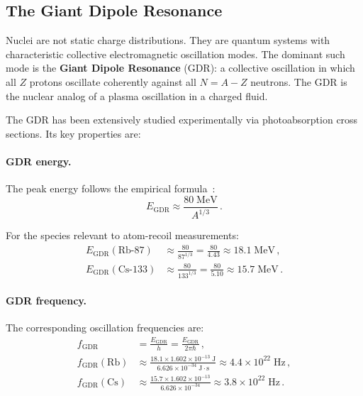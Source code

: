 \documentclass[aps,prd,twocolumn,superscriptaddress,nofootinbib]{revtex4-2}
\newcommand{\ee}[1]{\times 10^{#1}}
\newcommand{\fGDR}{f_{\mathrm{GDR}}}
\newcommand{\EGDR}{E_{\mathrm{GDR}}}
\begin{document}
\subsection{The Giant Dipole Resonance}
\label{sec:gdr-def}

Nuclei are not static charge distributions.  They are quantum
systems with characteristic collective electromagnetic oscillation
modes.  The dominant such mode is the \textbf{Giant Dipole Resonance}
(GDR): a collective oscillation in which all $Z$ protons oscillate
coherently against all $N = A - Z$ neutrons.  The GDR is the nuclear
analog of a plasma oscillation in a charged fluid.

The GDR has been extensively studied experimentally via
photoabsorption cross sections.  Its key properties are:

\paragraph{GDR energy.}
The peak energy follows the empirical formula~\cite{Berman1975}:
\begin{equation}\label{eq:gdr-energy}
\EGDR \approx \frac{80\;\mathrm{MeV}}{A^{1/3}}\,.
\end{equation}

For the species relevant to atom-recoil measurements:
\begin{align}
\EGDR(\text{Rb-87}) &\approx \frac{80}{87^{1/3}}
= \frac{80}{4.43} \approx 18.1\;\mathrm{MeV}\,,
\label{eq:gdr-rb}\\
\EGDR(\text{Cs-133}) &\approx \frac{80}{133^{1/3}}
= \frac{80}{5.10} \approx 15.7\;\mathrm{MeV}\,.
\label{eq:gdr-cs}
\end{align}

\paragraph{GDR frequency.}
The corresponding oscillation frequencies are:
\begin{align}
\fGDR &= \frac{\EGDR}{h} = \frac{\EGDR}{2\pi\hbar}\,,\\
\fGDR(\text{Rb}) &\approx \frac{18.1 \times 1.602\ee{-13}\;\mathrm{J}}
{6.626\ee{-34}\;\mathrm{J\cdot s}}
\approx 4.4\ee{22}\;\mathrm{Hz}\,,
\label{eq:f-gdr-rb}\\
\fGDR(\text{Cs}) &\approx \frac{15.7 \times 1.602\ee{-13}}
{6.626\ee{-34}}
\approx 3.8\ee{22}\;\mathrm{Hz}\,.
\label{eq:f-gdr-cs}
\end{align}
\end{document}
